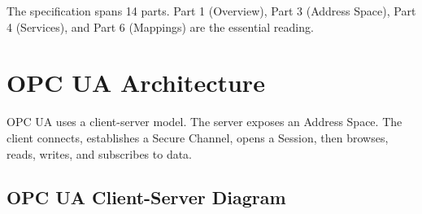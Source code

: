 \documentclass[12pt,twoside,openright]{memoir}
\begin{document}
The specification spans 14 parts. Part 1 (Overview), Part 3 (Address Space), Part 4 (Services), and Part 6
(Mappings) are the essential reading.

\chapter{OPC UA Architecture}

OPC UA uses a client-server model. The server exposes an Address Space. The client connects, establishes a
Secure Channel, opens a Session, then browses, reads, writes, and subscribes to data.

\section{OPC UA Client-Server Diagram}
\end{document}
